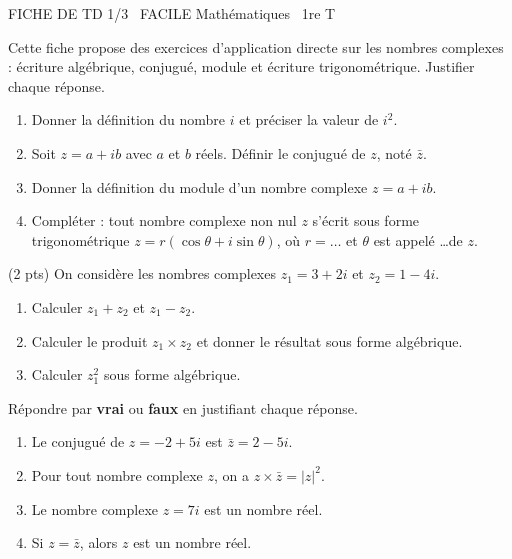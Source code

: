 \documentclass[11pt]{article}
\begin{document}
\begin{tcolorbox}[enhanced,colback=popink,colframe=popink,arc=10pt,boxrule=0pt,left=12pt,right=12pt,top=9pt,bottom=9pt]
{\color{white}\popxbold\small FICHE DE TD 1/3 \textbullet\ FACILE \hfill Mathématiques \textbullet\ 1re T\par}
\end{tcolorbox}
\vspace{4pt}
Cette fiche propose des exercices d'application directe sur les nombres complexes : écriture algébrique, conjugué, module et écriture trigonométrique. Justifier chaque réponse.

\begin{exercice}
\begin{enumerate}
\item Donner la définition du nombre $i$ et préciser la valeur de $i^2$.
\item Soit $z = a + ib$ avec $a$ et $b$ réels. Définir le conjugué de $z$, noté $\bar{z}$.
\item Donner la définition du module d'un nombre complexe $z = a + ib$.
\item Compléter : tout nombre complexe non nul $z$ s'écrit sous forme trigonométrique $z = r(\cos\theta + i\sin\theta)$, où $r = \ldots$ et $\theta$ est appelé \ldots de $z$.
\end{enumerate}
\end{exercice}

\begin{exercice} \hfill (2 pts)
On considère les nombres complexes $z_1 = 3 + 2i$ et $z_2 = 1 - 4i$.
\begin{enumerate}
\item Calculer $z_1 + z_2$ et $z_1 - z_2$.
\item Calculer le produit $z_1 \times z_2$ et donner le résultat sous forme algébrique.
\item Calculer $z_1^2$ sous forme algébrique.
\end{enumerate}
\end{exercice}

\begin{exercice}
Répondre par \textbf{vrai} ou \textbf{faux} en justifiant chaque réponse.
\begin{enumerate}
\item Le conjugué de $z = -2 + 5i$ est $\bar{z} = 2 - 5i$.
\item Pour tout nombre complexe $z$, on a $z \times \bar{z} = |z|^2$.
\item Le nombre complexe $z = 7i$ est un nombre réel.
\item Si $z = \bar{z}$, alors $z$ est un nombre réel.
\end{enumerate}
\end{exercice}
\end{document}
